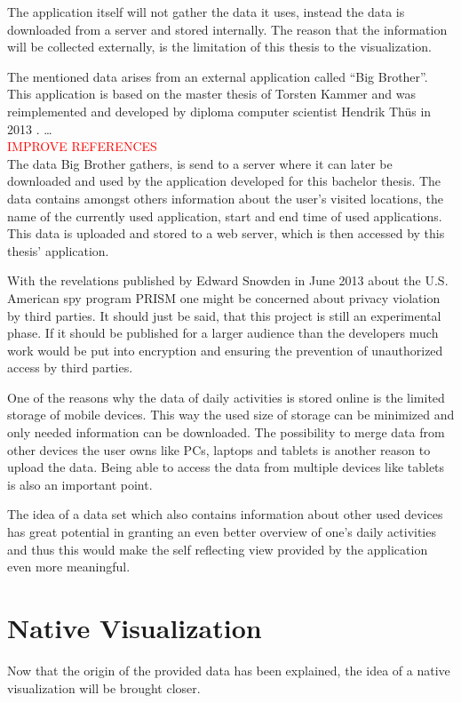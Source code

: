 The application itself will not gather the data it uses, instead the data is downloaded from a server and stored internally. The reason that the information will be collected externally, is the limitation of this thesis to the visualization.

The  mentioned data arises from an external application called ``Big Brother''. This application is based on the master thesis of Torsten Kammer and was reimplemented and developed by diploma computer scientist Hendrik Th\"us in 2013 \cite{bigbrother}. \ldots{} %
\\ \textcolor{red}{IMPROVE REFERENCES}\\
The data Big Brother gathers, is send to a server where it can later be downloaded and used by the application developed for this bachelor thesis. The data contains amongst others information about the user's visited locations, the name of the currently used application, start and end time of used applications. This data is uploaded and stored to a web server, which is then accessed by this thesis' application.

With  the revelations published by Edward Snowden in June 2013 about the U.S. American spy program PRISM one might be concerned about privacy violation by third parties. It should just be said, that this project is still an experimental phase. If it should be published for a larger audience than the developers much work would be put into encryption and ensuring the prevention of unauthorized access by third parties.

One  of the reasons why the data of daily activities is stored online is the limited storage of mobile devices. This way the used size of storage can be minimized and only needed information can be downloaded. The possibility to merge data from other devices the user owns like PCs, laptops and tablets is another reason to upload the data. Being able to access the data from multiple devices like tablets is also an important point.

The idea of a data set which also contains information about other used devices has great potential in granting an even better overview of one's daily activities and thus this would make the self reflecting view provided by the application even more meaningful.
\section{Native Visualization}
Now that the origin of the provided data has been explained, the idea of a native visualization will be brought closer.

